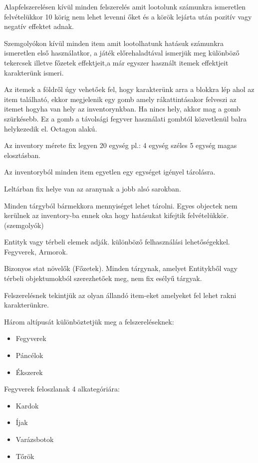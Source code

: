 Alapfelszerelésen kívül minden felszerelés amit lootolunk számunkra ismeretlen felvételükkor 10 körig nem lehet levenni őket és a körök lejárta után pozitív vagy negatív effektet adnak.

Szemgolyókon kívül minden item amit lootolhatunk hatásuk számunkra ismeretlen első használatkor, a játék előrehaladtával ismerjük meg különböző tekercsek illetve főzetek effektjeit,a már egyszer használt itemek effektjeit karakterünk ismeri.


Az itemek a földről úgy vehetőek fel, hogy karakterünk arra a blokkra lép ahol az item található, ekkor megjelenik egy gomb amely rákattintásakor felveszi az itemet hogyha van hely az inventorynkban. Ha nincs hely, akkor mag a gomb szürkésebb. Ez a gomb a távolsági fegyver használati gombtól közvetlenül balra helykezedik el. Octagon alakú.


Az inventory mérete fix legyen 20 egység pl.: 4 egység széles 5 egység magas elosztásban.

Az inventoryból minden item egyetlen egy egységet igényel tárolásra.

Leltárban fix helye van az aranynak a jobb alsó sarokban.

Minden tárgyból bármekkora mennyiséget lehet tárolni.
Egyes objectek nem kerülnek az inventory-ba ennek oka hogy hatásukat kifejtik felvételükkör. (szemgolyók)

Entityk vagy térbeli elemek adják.
különböző felhasználási lehetőségekkel.
Fegyverek, Armorok.

Bizonyos stat növelők (Főzetek).
Minden tárgynak, amelyet Entitykből vagy térbeli objektumokból szerezhetőek meg, nem fix esélyű tárgyak.


Felszerelésnek tekintjük az olyan állandó item-eket amelyeket fel lehet rakni karakterünkre.

Három altípusát különböztetjük meg a felszereléseknek:
\begin{itemize}
  \item Fegyverek
  \item Páncélok
  \item Ékszerek
\end{itemize}

Fegyverek feloszlanak 4 alkategóriára:
\begin{itemize}
  \item Kardok
  \item Íjak
  \item Varázsbotok
  \item Tőrök
\end{itemize}

